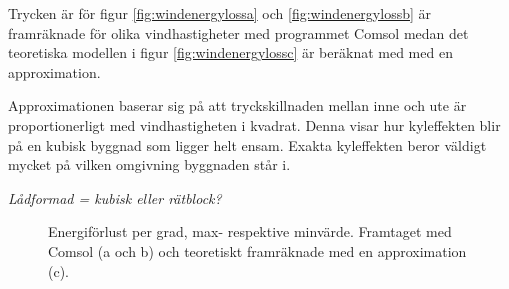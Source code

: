 Trycken är för figur \ref{fig:windenergylossa} och \ref{fig:windenergylossb} är framräknade för 
olika vindhastigheter med programmet Comsol medan det teoretiska modellen i figur 
\ref{fig:windenergylossc} är beräknat med med en approximation. 

Approximationen baserar sig
 på att tryckskillnaden mellan inne och ute är proportionerligt med vindhastigheten i kvadrat. Denna visar hur kyleffekten blir på en kubisk byggnad som ligger helt ensam. Exakta kyleffekten beror väldigt mycket på vilken omgivning byggnaden står i.
 
\emph{\color{red} Lådformad = kubisk eller rätblock?}

\begin{figure}[hpbt]
\centering
{}
\vspace{5mm}


\caption{\label{fig:windenergyloss}Energiförlust per grad, max- respektive minvärde.
Framtaget med Comsol (a och b) och teoretiskt framräknade med en approximation (c).}
\end{figure}

